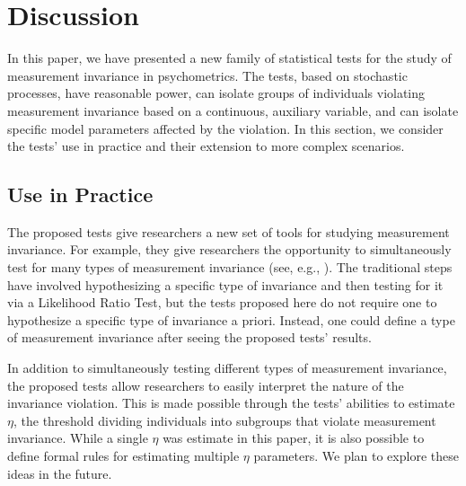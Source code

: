 \documentclass[man]{apa}
\begin{document}
\section{Discussion}
In this paper, we have presented a new family of statistical tests for
the study of measurement invariance in psychometrics.  The tests,
based on stochastic processes, have reasonable power, can isolate
groups of individuals violating measurement invariance based on a
continuous, auxiliary variable, and can
isolate specific model parameters affected by the violation.  In this
section, we consider the tests' use in practice and their 
extension to more complex scenarios.

\subsection{Use in Practice}
The proposed tests give researchers a new set of tools for studying 
measurement invariance.  For example, they give researchers the
opportunity to simultaneously test for many types of measurement
invariance (see, e.g., ).  The traditional
steps have involved hypothesizing a specific type of invariance and
then testing for it via a Likelihood Ratio Test, but the tests
proposed here do not require one to hypothesize a specific type of
invariance a priori.  Instead, one could define a type of measurement
invariance after seeing the proposed tests' results.

In addition to simultaneously testing different types of measurement
invariance, the proposed tests allow researchers to easily interpret
the nature of the invariance violation.  This is made possible through
the tests' abilities to estimate $\eta$, the threshold dividing
individuals into subgroups that violate
measurement invariance.  While a single $\eta$ was estimate in this
paper, it is also possible to define 
formal rules for estimating multiple $\eta$ parameters.  We plan to
explore these ideas in the future.


\end{document}
